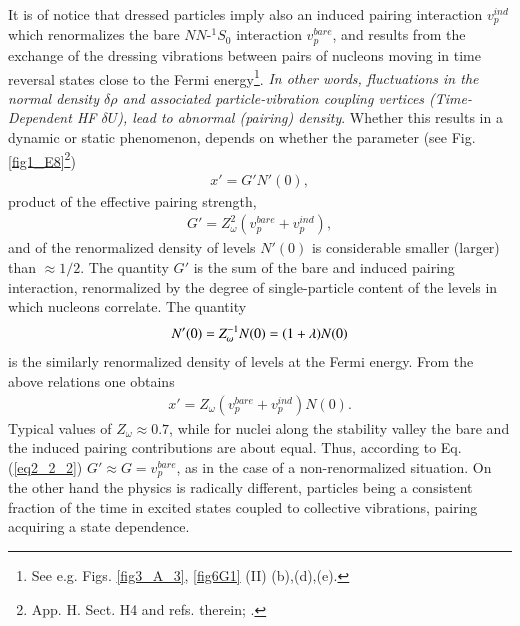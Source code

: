 It is of notice that dressed particles  imply also an induced pairing interaction $v_p^{ind}$ which renormalizes the bare $NN$-$^1S_0$ interaction $v_p^{bare}$, and results  from the exchange of the dressing vibrations between pairs of nucleons moving in time reversal states close to the Fermi energy\footnote{See e.g. Figs. \ref{fig3_A_3},  \ref{fig6G1} (II) (b),(d),(e).}. \textit{In other words, fluctuations in the normal density $\delta \rho$    and associated particle-vibration coupling vertices (Time-Dependent HF $\delta U$), lead to abnormal (pairing) density}. Whether this results in  a dynamic or static phenomenon, depends on whether the parameter (see Fig. \ref{fig1_E8}\footnote{\cite{Brink:05} App. H. Sect. H4 and refs. therein; \cite{Barranco:05}.}) 
\begin{align}\label{eq2_1_10}
x'=G'N'(0),  
\end{align}
product of the effective pairing strength, 
\begin{align}\label{eq2_2_2}
G'=Z_\omega^2(v_p^{bare}+v_p^{ind}),
\end{align}
and of the renormalized density of levels $N'(0)$ is considerable smaller  (larger) than $\approx1/2$. The quantity $G'$ is the sum of the bare and induced pairing interaction, renormalized by the degree of single-particle content of the levels in which nucleons correlate. The quantity 
\begin{align}\label{eq3.2.3}
N'(0)=Z_\omega^{-1}N(0)=(1+\lambda)N(0) \idx{Mass enhancement factor!--and single-particle content}
\end{align}
is the similarly renormalized density of levels at the Fermi energy. From the above relations one obtains 
\begin{align}
x'=Z_\omega(v_p^{bare}+v_p^{ind})N(0).
\end{align}
Typical values of $Z_\omega\approx0.7$, while for nuclei along the stability valley the bare and the induced pairing contributions are about equal. Thus, according to Eq. (\ref{eq2_2_2})  $G'\approx G=v^{bare}_p$, as in the case of a non-renormalized situation. On the other hand the physics is radically different, particles being a consistent fraction of the time in excited states coupled to collective vibrations, pairing acquiring a state dependence. 
 
